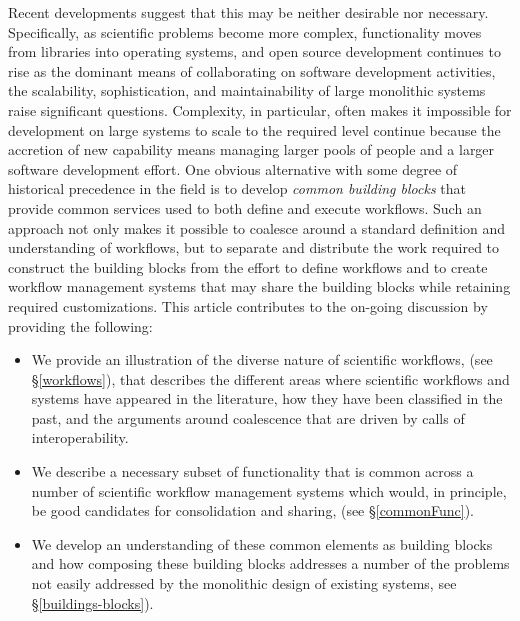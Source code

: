 Recent developments suggest that this may be neither desirable nor necessary. Specifically, as scientific problems become more complex, functionality moves from libraries into operating systems, and open source development continues to rise as the dominant means of collaborating on software development activities, the scalability, sophistication, and maintainability of large monolithic systems raise significant questions. Complexity, in particular, often makes it impossible for development on large systems to scale to the required level continue because the accretion of new capability means managing larger pools of people and a larger software development effort. One obvious alternative with some degree of historical precedence in the field is to develop \textit{common building blocks} that provide common services used to both define and execute workflows. Such an approach not only makes it possible to coalesce around a standard definition and understanding of workflows, but to separate and distribute the work required to construct the building blocks from the effort to define workflows and to create workflow management systems that may share the building blocks while retaining required customizations. This article contributes to the on-going discussion by providing the following:
\begin{itemize}
    \item We provide an illustration of the diverse nature of scientific workflows, (see \S \ref{workflows}), that describes the different areas where scientific workflows and systems have appeared in the literature, how they have been classified in the past, and the arguments around coalescence that are driven by calls of interoperability.
    \item We describe a necessary subset of functionality that is common across a number of scientific workflow management systems which would, in principle, be good candidates for consolidation and sharing, (see \S \ref{commonFunc}).
    \item We develop an understanding of these common elements as building blocks and how composing these building blocks addresses a number of the problems not easily addressed by the monolithic design of existing systems, see \S \ref{buildings-blocks}).
\end{itemize}


